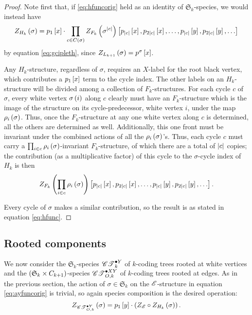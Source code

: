 \documentclass[sectionflow,singlespace,twoside,boldmathhdr]{brandiss} %
\numberwithin{section}{chapter}
\numberwithin{figure}{chapter}
\begin{document}
\begin{proof}
  Note first that, if \eqref{eq:hfuncorig} held as an identity of $\mathfrak{S}_{k}$-species, we would instead have
  \begin{equation*}
    Z_{H_{k}} \pbrac{\sigma} = p_{1} \sbrac{x} \cdot \prod_{c \in C \pbrac{\sigma}} Z_{F_{k}} \pbrac{\sigma^{\abs{c}}} \sbrac{p_{\abs{c}} \sbrac{x}, p_{2 \abs{c}} \sbrac{x}, \dots, p_{\abs{c}} \sbrac{y}, p_{2 \abs{c}} \sbrac{y}, \dots}
  \end{equation*}
  by equation \eqref{eq:gcipleth}, since $Z_{L_{k+1}} \pbrac{\sigma} = p^{\sigma} \sbrac{x}$.

  Any $H_{k}$-structure, regardless of $\sigma$, requires an $X$-label for the root black vertex, which contributes a $p_{1} \sbrac{x}$ term to the cycle index.
  The other labels on an $H_{k}$-structure will be divided among a collection of $F_{k}$-structures.
  For each cycle $c$ of $\sigma$, every white vertex $\sigma \pbrac{i}$ along $c$ clearly must have an $F_{k}$-structure which is the image of the structure on its cycle-predecessor, white vertex $i$, under the map $\rho_{i} \pbrac{\sigma}$.
  Thus, once the $F_{k}$-structure at any one white vertex along $c$ is determined, all the others are determined as well.
  Additionally, this one front must be invariant under the combined actions of all the $\rho_{i} \pbrac{\sigma}$'s.
  Thus, each cycle $c$ must carry a $\prod_{i \in c} \rho_{i} \pbrac{\sigma}$-invariant $F_{k}$-structure, of which there are a total of $\abs{c}$ copies; the contribution (as a multiplicative factor) of this cycle to the $\sigma$-cycle index of $H_{k}$ is then
  \begin{equation*}
    Z_{F_{k}} \pbrac{\prod_{i \in c} \rho_{i} \pbrac{\sigma}} \sbrac{p_{\abs{c}} \sbrac{x}, p_{2 \abs{c}} \sbrac{x}, \dots, p_{\abs{c}} \sbrac{y}, p_{2 \abs{c}} \sbrac{y}, \dots}.
  \end{equation*}

  Every cycle of $\sigma$ makes a similar contribution, so the result is as stated in equation \eqref{eq:hfunc}.
\end{proof}

\subsection{Rooted components}\label{ss:ktcycindroot}
We now consider the $\mathfrak{S}_{k}$-species $\pointed[Y]{\specname{CT}}_{k}$ of $k$-coding trees rooted at white vertices and the $\pbrac{\mathfrak{S}_{k} \times C_{k+1}}$-species $\pointed[XY]{\specname{CT}}_{O, k}$ of $k$-coding trees rooted at edges.
As in the previous section, the action of $\sigma \in \mathfrak{S}_{k}$ on the $\specname{E}$-structure in equation \eqref{eq:ayfuncorig} is trivial, so again species composition is the desired operation:
\begin{equation}
  \label{eq:ayfunc}
  Z_{\pointed[Y]{\specname{CT}}_{O, k}} \pbrac{\sigma} = p_{1} \sbrac{y} \cdot \pbrac{Z_{\specname{E}} \circ Z_{H_{k}} \pbrac{\sigma}}.
\end{equation}
\end{document}
